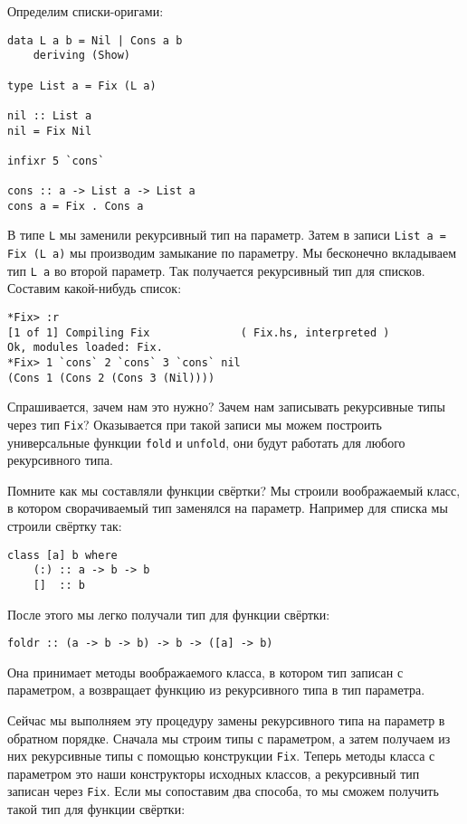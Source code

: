Определим списки-оригами:

\begin{verbatim}
data L a b = Nil | Cons a b
    deriving (Show)

type List a = Fix (L a)

nil :: List a
nil = Fix Nil

infixr 5 `cons`

cons :: a -> List a -> List a
cons a = Fix . Cons a
\end{verbatim}

В типе \texttt{L} мы заменили рекурсивный тип на параметр. Затем в
записи \texttt{List a = Fix (L a)} мы производим замыкание по параметру.
Мы бесконечно вкладываем тип \texttt{L a} во второй параметр. Так
получается рекурсивный тип для списков. Составим какой-нибудь список:

\begin{verbatim}
*Fix> :r
[1 of 1] Compiling Fix              ( Fix.hs, interpreted )
Ok, modules loaded: Fix.
*Fix> 1 `cons` 2 `cons` 3 `cons` nil
(Cons 1 (Cons 2 (Cons 3 (Nil))))
\end{verbatim}

Спрашивается, зачем нам это нужно? Зачем нам записывать рекурсивные типы
через тип \texttt{Fix}? Оказывается при такой записи мы можем построить
универсальные функции \texttt{fold} и \texttt{unfold}, они будут
работать для любого рекурсивного типа.

Помните как мы составляли функции свёртки? Мы строили воображаемый
класс, в котором сворачиваемый тип заменялся на параметр. Например для
списка мы строили свёртку так:

\begin{verbatim}
class [a] b where
    (:) :: a -> b -> b
    []  :: b
\end{verbatim}

После этого мы легко получали тип для функции свёртки:

\begin{verbatim}
foldr :: (a -> b -> b) -> b -> ([a] -> b)
\end{verbatim}

Она принимает методы воображаемого класса, в котором тип записан с
параметром, а возвращает функцию из рекурсивного типа в тип параметра.

Сейчас мы выполняем эту процедуру замены рекурсивного типа на параметр в
обратном порядке. Сначала мы строим типы с параметром, а затем получаем
из них рекурсивные типы с помощью конструкции \texttt{Fix}. Теперь
методы класса с параметром это наши конструкторы исходных классов, а
рекурсивный тип записан через \texttt{Fix}. Если мы сопоставим два
способа, то мы сможем получить такой тип для функции свёртки:

